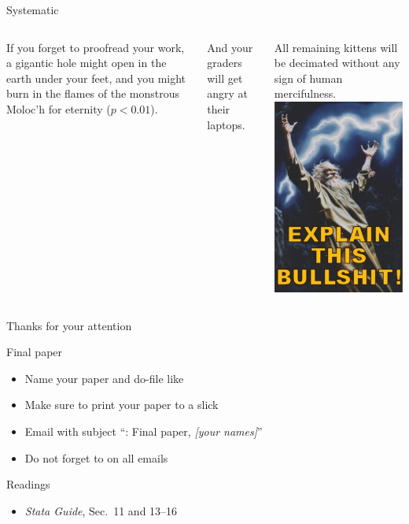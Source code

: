 \documentclass[t]{beamer}
\begin{document}
	
	\begin{frame}[t]{Systematic }
		\begin{columns}[T]
			If you forget to proofread your work, a gigantic hole might open in the earth under your feet, and you might burn in the flames of the monstrous Moloc'h for eternity ($p < 0.01$).\vspace{1em}
			
			And your graders will get angry at their laptops.\vspace{1em}
			
			All remaining kittens will be decimated without any sign of human mercifulness.
			\includegraphics[height=.66\paperheight]{explain.jpg}
		\end{columns}
	\end{frame}
	
	
    \begin{frame}[c]{Thanks for your attention}
    
        \begin{alertblock}{Final paper}
            \begin{itemize}
                \item Name your paper and do-file like 
                \item Make sure to print your paper to a slick 
                \item Email with subject ``: Final paper, \textit{[your names]}''
                \item Do not forget to  on all emails
            \end{itemize}
        \end{alertblock}
        
        \begin{block}{Readings}
            \begin{itemize}
                \item \emph{Stata Guide}, Sec.~11 and 13--16
            \end{itemize}
        \end{block}
            
    \end{frame}
\end{document}

